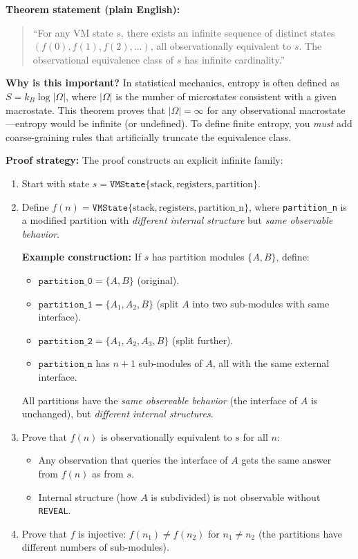\textbf{Theorem statement (plain English):}
\begin{quote}
``For any VM state $s$, there exists an infinite sequence of distinct states $(f(0), f(1), f(2), \ldots)$, all observationally equivalent to $s$. The observational equivalence class of $s$ has infinite cardinality.''
\end{quote}

\textbf{Why is this important?} In statistical mechanics, entropy is often defined as $S = k_B \log |\Omega|$, where $|\Omega|$ is the number of microstates consistent with a given macrostate. This theorem proves that $|\Omega| = \infty$ for any observational macrostate---entropy would be infinite (or undefined). To define finite entropy, you \textit{must} add coarse-graining rules that artificially truncate the equivalence class.

\textbf{Proof strategy:} The proof constructs an explicit infinite family:
\begin{enumerate}
    \item Start with state $s = \texttt{VMState}\{\text{stack}, \text{registers}, \text{partition}\}$.
    
    \item Define $f(n) = \texttt{VMState}\{\text{stack}, \text{registers}, \text{partition\_n}\}$, where \texttt{partition\_n} is a modified partition with \textit{different internal structure} but \textit{same observable behavior}.
    
    \textbf{Example construction:} If $s$ has partition modules $\{A, B\}$, define:
    \begin{itemize}
        \item $\texttt{partition\_0} = \{A, B\}$ (original).
        \item $\texttt{partition\_1} = \{A_1, A_2, B\}$ (split $A$ into two sub-modules with same interface).
        \item $\texttt{partition\_2} = \{A_1, A_2, A_3, B\}$ (split further).
        \item $\texttt{partition\_n}$ has $n+1$ sub-modules of $A$, all with the same external interface.
    \end{itemize}
    All partitions have the \textit{same observable behavior} (the interface of $A$ is unchanged), but \textit{different internal structures}.
    
    \item Prove that $f(n)$ is observationally equivalent to $s$ for all $n$:
    \begin{itemize}
        \item Any observation that queries the interface of $A$ gets the same answer from $f(n)$ as from $s$.
        \item Internal structure (how $A$ is subdivided) is not observable without \texttt{REVEAL}.
    \end{itemize}
    
    \item Prove that $f$ is injective: $f(n_1) \neq f(n_2)$ for $n_1 \neq n_2$ (the partitions have different numbers of sub-modules).
\end{enumerate}

